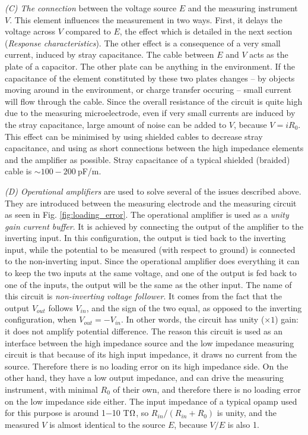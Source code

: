 \emph{(C) The connection} between the voltage source $E$ and the measuring instrument $V$.
This element influences the measurement in two ways.
First, it delays the voltage across $V$ compared to $E$, the effect which is detailed in the next section (\emph{Response characteristics}).
The other effect is a consequence of a very small current, induced by stray capacitance.
The cable between $E$ and $V$ acts as the plate of a capacitor.
The other plate can be anything in the environment.
If the capacitance of the element constituted by these two plates changes -- by objects moving around in the environment, or charge transfer occuring -- small current will flow through the cable.
Since the overall resistance of the circuit is quite high due to the measuring microelectrode, even if very small currents are induced by the stray capacitance, large amount of noise can be added to $V$, because $V = iR_0$.
This effect can be minimised by using shielded cables to decrease stray capacitance, and using as short connections between the high impedance elements and the amplifier as possible.
Stray capacitance of a typical shielded (braided) cable is $\sim 100-200~$pF/m.

\emph{(D) Operational amplifiers} are used to solve several of the issues described above.
They are introduced between the measuring electrode and the measuring circuit as seen in Fig. \ref{fig:loading_error}.
The operational amplifier is used as a \emph{unity gain current buffer}.
It is achieved by connecting the output of the amplifier to the inverting input.
In this configuration, the output is tied back to the inverting input, while the potential to be measured (with respect to ground) is connected to the non-inverting input.
Since the operational amplifier does everything it can to keep the two inputs at the same voltage, and one of the output is fed back to one of the inputs, the output will be the same as the other input.  
The name of this circuit is \emph{non-inverting voltage follower}.
It comes from the fact that the output $V_{out}$ follows $V_{in}$, and the sign of the two equal, as opposed to the inverting configuration, when $V_{out}=-V_{in}$.
In other words, the circuit has unity ($\times 1$) gain: it does not amplify potential difference.
The reason this circuit is used as an interface between the high impedance source and the low impedance measuring circuit is that because of its high input impedance, it draws no current from the source.
Therefore there is no loading error on its high impedance side.
On the other hand, they have a low output impedance, and can drive the measuring instrument, with minimal $R_0$ of their own, and therefore there is no loading error on the low impedance side either.
The input impedance of a typical opamp used for this purpose is around 1$-$10 T$\ohm$, so $R_{in}/(R_{in}+R_0)$ is unity, and the measured $V$ is almost identical to the source $E$, because $V/E$ is also 1.

